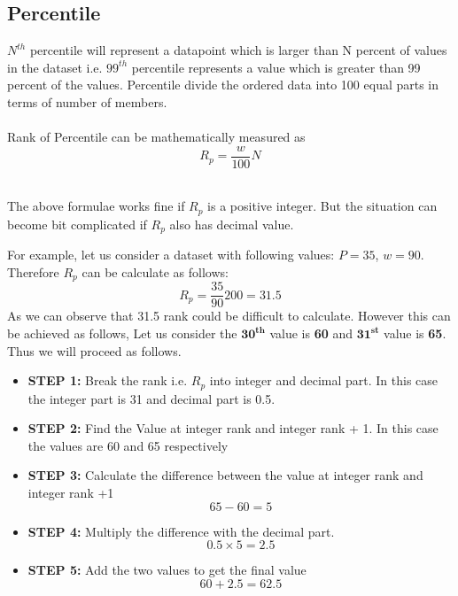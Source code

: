 \documentclass[twoside,12pt]{report}  %
\begin{document}
\subsection{Percentile}
\begin{tcolorbox}[colback=red!5!white, colframe=red!75!black, title = \textbf{Percentile}]
	$N^{th}$ percentile will represent a datapoint which is larger than N percent of values in the dataset i.e. $99^{th}$ percentile represents a value which is greater than 99 percent of the values. Percentile divide the ordered data into 100 equal parts in terms of number of members.
	\\
	\\Rank of Percentile can be mathematically measured as
	$$ \boxed{R_p = \frac{w}{100}N} $$
\end{tcolorbox}
\noindent
\\
The above formulae works fine if $R_p$ is a positive integer. But the situation can become bit complicated if $R_p$ also has decimal value. 
\begin{tcolorbox}[colback=blue!5!white, colframe=blue!75!black, title = \textbf{Rank of Percentile}]
	For example, let us consider a dataset with following values:
	$P=35$, $w=90$. Therefore $R_p$ can be calculate as follows:
	$$R_p = \frac{35}{90}200 = 31.5$$
	As we can observe that 31.5 rank could be difficult to calculate. However this can be achieved as follows, Let us consider the $\boldsymbol{30^{th}}$ value is \textbf{60} and $\boldsymbol{31^{st}}$ value is \textbf{65}. Thus we will proceed as follows.
	\begin{itemize}
		\item \textbf{STEP 1:} Break the rank i.e. $R_p$ into integer and decimal part. In this case the integer part is 31 and decimal part is 0.5.
		\item \textbf{STEP 2:} Find the Value at integer rank and integer rank + 1. In this case the values are 60 and 65 respectively
		\item \textbf{STEP 3:} Calculate the difference between the value at integer rank and integer rank +1
		$$65 - 60 = 5$$ 
		\item \textbf{STEP 4:} Multiply the difference with the decimal part.
		$$ 0.5 \times  5 = 2.5$$
		\item \textbf{STEP 5:} Add the two values to get the final value
		$$ 60 + 2.5 = 62.5 $$
	\end{itemize}
\end{tcolorbox}
\noindent
\end{document}
